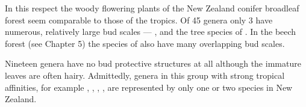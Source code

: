 In this respect the woody flowering plants of the New Zealand conifer broadleaf forest seem comparable to those of the tropics.
Of 45 genera only 3 have numerous, relatively large bud scales --- ,  and the tree species of .
In the beech forest (see Chapter 5) the species of  also have many overlapping bud scales.

Nineteen genera have no bud protective structures at all although the immature leaves are often hairy.
Admittedly, genera in this group with strong tropical affinities, for example , , , , are represented by only one or two species in New Zealand.

